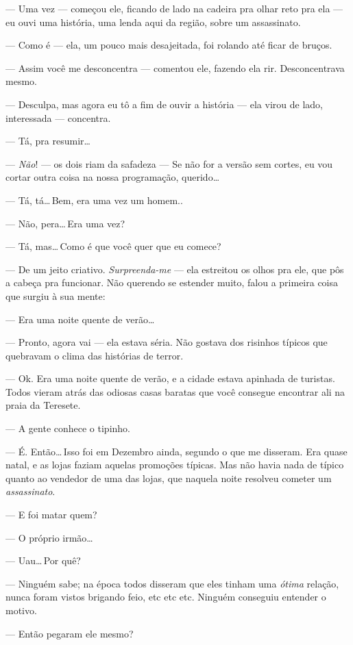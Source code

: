 --- Uma vez --- começou ele, ficando de lado na cadeira pra olhar reto pra ela --- eu ouvi uma história, uma lenda aqui da região, sobre um assassinato.

--- Como é --- ela, um pouco mais desajeitada, foi rolando até ficar de bruços.

--- Assim você me desconcentra --- comentou ele, fazendo ela rir. Desconcentrava mesmo.

--- Desculpa, mas agora eu tô a fim de ouvir a história --- ela virou de lado, interessada --- concentra.

--- Tá, pra resumir\ldots

--- \emph{Não}! --- os dois riam da safadeza --- Se não for a versão sem cortes, eu vou cortar outra coisa na nossa programação, querido\ldots

--- Tá, tá\ldots\,Bem, era uma vez um homem..

--- Não, pera\ldots\,Era uma vez?

--- Tá, mas\ldots\,Como é que você quer que eu comece?

--- De um jeito criativo. \emph{Surpreenda-me} --- ela estreitou os olhos pra ele, que pôs a cabeça pra funcionar. Não querendo se estender muito, falou a primeira coisa que surgiu à sua mente:

--- Era uma noite quente de verão\ldots

--- Pronto, agora vai --- ela estava séria. Não gostava dos risinhos típicos que quebravam o clima das histórias de terror.

--- Ok. Era uma noite quente de verão, e a cidade estava apinhada de turistas. Todos vieram atrás das odiosas casas baratas que você consegue encontrar ali na praia da Teresete.

--- A gente conhece o tipinho.

--- É. Então\ldots\,Isso foi em Dezembro ainda, segundo o que me disseram. Era quase natal, e as lojas faziam aquelas promoções típicas. Mas não havia nada de típico quanto ao vendedor de uma das lojas, que naquela noite resolveu cometer um \emph{assassinato}.

--- E foi matar quem?

--- O próprio irmão\ldots

--- Uau\ldots\,Por quê?

--- Ninguém sabe; na época todos disseram que eles tinham uma \emph{ótima} relação, nunca foram vistos brigando feio, etc etc etc. Ninguém conseguiu entender o motivo.

--- Então pegaram ele mesmo?

